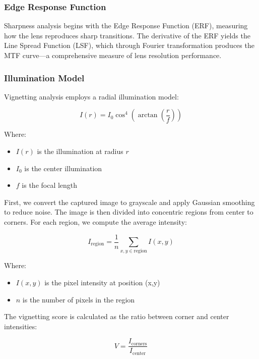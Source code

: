 \subsubsection{Edge Response Function}
Sharpness analysis begins with the Edge Response Function (ERF), measuring how the lens reproduces sharp transitions. The derivative of the ERF yields the Line Spread Function (LSF), which through Fourier transformation produces the MTF curve---a comprehensive measure of lens resolution performance.

\subsubsection{Illumination Model}
Vignetting analysis employs a radial illumination model:

\begin{equation}
I(r) = I_0 \cos^4\left(\arctan\left(\frac{r}{f}\right)\right)
\end{equation}

Where:
\begin{itemize}
    \item \( I(r) \) is the illumination at radius \( r \)
    \item \( I_0 \) is the center illumination
    \item \( f \) is the focal length
\end{itemize}


First, we convert the captured image to grayscale and apply Gaussian smoothing to reduce noise. The image is then divided into concentric regions from center to corners. For each region, we compute the average intensity:

\begin{equation}
I_{\text{region}} = \frac{1}{n} \sum_{x,y \in \text{region}} I(x,y)
\end{equation}

Where:
\begin{itemize}
    \item \( I(x,y) \) is the pixel intensity at position (x,y)
    \item \( n \) is the number of pixels in the region
\end{itemize}

The vignetting score is calculated as the ratio between corner and center intensities:

\begin{equation}
V = \frac{I_{\text{corners}}}{I_{\text{center}}}
\end{equation}

